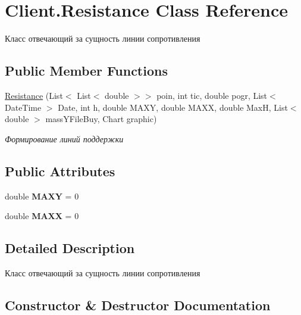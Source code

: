 \hypertarget{class_client_1_1_resistance}{}\section{Client.\+Resistance Class Reference}
\label{class_client_1_1_resistance}


Класс отвечающий за сущность линии сопротивления  


\subsection*{Public Member Functions}
\begin{DoxyCompactItemize}
\item 
\hyperlink{class_client_1_1_resistance_a8bac71f5502f2fd1f5fa666839bbb4b4}{Resistance} (List$<$ List$<$ double $>$$>$ poin, int tic, double pogr, List$<$ Date\+Time $>$ Date, int h, double M\+A\+XY, double M\+A\+XX, double MaxH, List$<$ double $>$ mass\+Y\+File\+Buy, Chart graphic)
\begin{DoxyCompactList}\small\item\em Формирование линий поддержки \end{DoxyCompactList}\end{DoxyCompactItemize}
\subsection*{Public Attributes}
\begin{DoxyCompactItemize}
\item 
\hypertarget{class_client_1_1_resistance_a7fed455f08370e12fe44a55d6f80cb75}{}\label{class_client_1_1_resistance_a7fed455f08370e12fe44a55d6f80cb75} 
double {\bfseries M\+A\+XY} = 0
\item 
\hypertarget{class_client_1_1_resistance_a041175e708b816692b43162cd423c3f2}{}\label{class_client_1_1_resistance_a041175e708b816692b43162cd423c3f2} 
double {\bfseries M\+A\+XX} = 0
\end{DoxyCompactItemize}


\subsection{Detailed Description}
Класс отвечающий за сущность линии сопротивления 



\subsection{Constructor \& Destructor Documentation}
\hypertarget{class_client_1_1_resistance_a8bac71f5502f2fd1f5fa666839bbb4b4}{}\label{class_client_1_1_resistance_a8bac71f5502f2fd1f5fa666839bbb4b4} 
